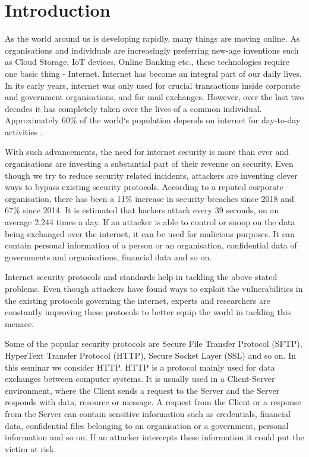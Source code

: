 \chapter{Introduction}

As the world around us is developing rapidly, many things are moving online. As organisations and individuals are increasingly preferring new-age inventions such as Cloud Storage, IoT devices, Online Banking etc., these technologies require one basic thing - Internet. Internet has become an integral part of our daily lives. In its early years, internet was only used for crucial transactions inside corporate and government organisations, and for mail exchanges. However, over the last two decades it has completely taken over the lives of a common individual. Approximately 60\% of the world`s population depends on internet for day-to-day activities \cite{b16}. 

With such advancements, the need for internet security is more than ever and organisations are investing a substantial part of their revenue on security\cite{b2}. Even though we try to reduce security related incidents, attackers are inventing clever ways to bypass existing security protocols. According to a reputed corporate organisation, there has been a 11\% increase in security breaches since 2018 and 67\% since 2014\cite{b3}. It is estimated that hackers attack every 39 seconds, on an average 2,244 times a day\cite{b4}. If an attacker is able to control or snoop on the data being exchanged over the internet, it can be used for malicious purposes. It can contain personal information of a person or an organisation, confidential data of governments and organisations, financial data and so on.

Internet security protocols and standards help in tackling the above stated problems. Even though attackers have found ways to exploit the vulnerabilities in the existing protocols governing the internet, experts and researchers are constantly improving these protocols to better equip the world in tackling this menace.  

Some of the popular security protocols are Secure File Transfer Protocol (SFTP), HyperText Transfer Protocol (HTTP), Secure Socket Layer (SSL) and so on. In this seminar we consider HTTP. HTTP is a protocol mainly used for data exchanges between computer systems. It is usually used in a Client-Server environment, where the Client sends a request to the Server and the Server responds with data, resource or message. A request from the Client or a response from the Server can contain sensitive information such as credentials, financial data, confidential files belonging to an organisation or a government, personal information and so on. If an attacker intercepts these information it could put the victim at risk.  

